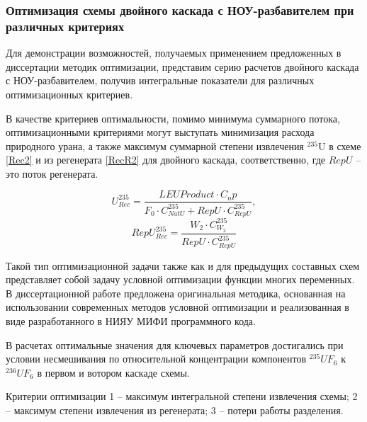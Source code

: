 \subsubsection{Оптимизация схемы двойного каскада с НОУ-разбавителем при различных критериях}

Для демонстрации возможностей, получаемых применением предложенных в диссертации методик оптимизации, представим серию расчетов двойного каскада с НОУ-разбавителем, получив интегральные показатели для различных оптимизационных критериев.

В качестве критериев оптимальности, помимо минимума суммарного потока, оптимизационными критериями могут выступать минимизация расхода природного урана, а также максимум суммарной степени извлечения $^{235}$U в схеме \ref{Rec2} и из регенерата \ref{RecR2} для двойного каскада, соответственно, где $RepU$ -- это поток регенерата.

\begin{equation} \label{Rec2} 
    U^{235}_{Rec} = \frac{LEU Product \cdot C_np}{F_0 \cdot C_{NatU}^{235} + RepU \cdot C_{RepU}^{235}}, 
\end{equation} 
\begin{equation} \label{RecR2} 
    RepU^{235}_{Rec} = \frac{W_2\cdot C_{W_2}^{235}}{RepU \cdot C_{RepU}^{235}}        
\end{equation} 

Такой тип оптимизационной задачи также как и для предыдущих составных схем представляет собой задачу условной оптимизации функции многих переменных. В диссертационной работе предложена оригинальная методика, основанная на использовании современных методов условной оптимизации и реализованная в виде разработанного в НИЯУ МИФИ программного кода.

В расчетах оптимальные значения для ключевых параметров достигались при условии несмешивания по относительной концентрации компонентов $^{235}UF_6$ к $^{236}UF_6$ в первом и вотором каскаде схемы.

Критерии оптимизации 1 -- максимум интегральной степени извлечения схемы; 2 -- максимум степени извлечения из регенерата; 3 -- потери работы разделения.

